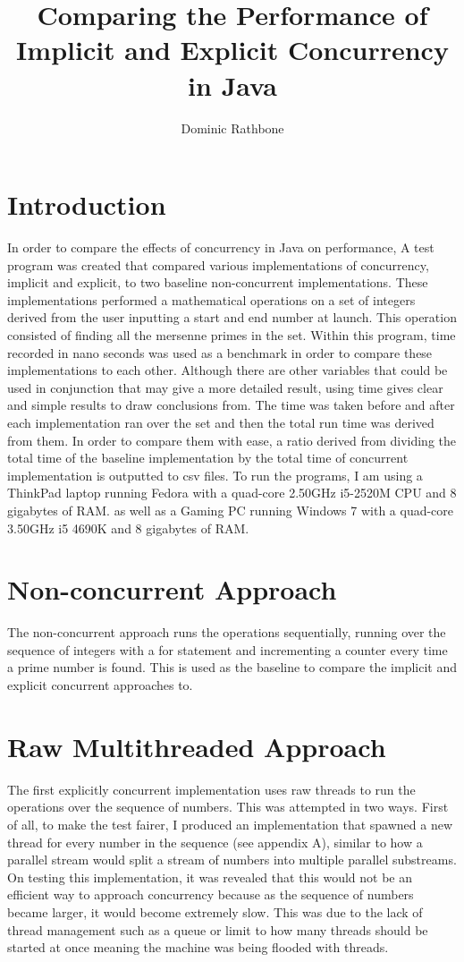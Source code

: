 \documentclass[]{report}
\title{Comparing the Performance of Implicit and Explicit Concurrency in Java}
\author{Dominic Rathbone}
\begin{document}
\maketitle

\section*{Introduction}
In order to compare the effects of concurrency in Java on performance, A test program was created that compared various implementations of concurrency, implicit and explicit, to two baseline non-concurrent implementations. These implementations performed a mathematical operations on a set of integers derived from the user inputting a start and end number at launch. This operation consisted of finding all the mersenne primes in the set. Within this program, time recorded in nano seconds was used as a benchmark in order to compare these implementations to each other. Although there are other variables that could be used in conjunction that may give a more detailed result, using time gives clear and simple results to draw conclusions from. The time was taken before and after each implementation ran over the set and then the total run time was derived from them. In order to compare them with ease, a ratio derived from dividing the total time of the baseline implementation by the total time of concurrent implementation is outputted to csv files. To run the programs, I am using a ThinkPad laptop running Fedora with a quad-core 2.50GHz i5-2520M CPU and 8 gigabytes of RAM. as well as a Gaming PC running Windows 7 with a quad-core 3.50GHz i5 4690K and 8 gigabytes of RAM.

\section{Non-concurrent Approach}
The non-concurrent approach runs the operations sequentially, running over the sequence of integers with a for statement and incrementing a counter every time a prime number is found. This is used as the baseline to compare the implicit and explicit concurrent approaches to.

\section{Raw Multithreaded Approach}
The first explicitly concurrent implementation uses raw threads to run the operations over the sequence of numbers. This was attempted in two ways. First of all, to make the test fairer, I produced an implementation that spawned a new thread for every number in the sequence (see appendix A), similar to how a parallel stream would split a stream of numbers into multiple parallel substreams. On testing this implementation, it was revealed that this would not be an efficient way to approach concurrency because  as the sequence of numbers became larger, it would become extremely slow. This was due to the lack of thread management such as a queue or limit to how many threads should be started at once meaning the machine was being flooded with threads. 
\end{document}
